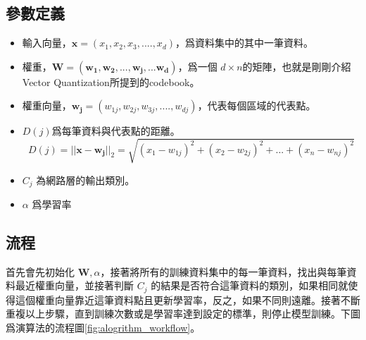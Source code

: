 	\subsection{參數定義}

    \begin{itemize}
        \item
			輸入向量，\(\mathbf{x} = (x_1,x_2,x_3,....,x_d)\)，爲資料集中的其中一筆資料。

        
        \item
			權重，\(\mathbf{W} = (\mathbf{w_1,w_2,...,w_j,...w_d})\)，爲一個 \(d \times n \)的矩陣，也就是剛剛介紹Vector Quantization所提到的codebook。 
        \item
			權重向量，\(\mathbf{w_{j}} = (w_{1j},w_{2j},w_{3j},....,w_{dj})\)，代表每個區域的代表點。
        
        \item
			\(D(j)\)爲每筆資料與代表點的距離。
			$$D(j)=||\mathbf{x}-\mathbf{w_j}||_2 = \sqrt{(x_1-w_{1j})^2+(x_2-w_{2j})^2+...+(x_n-w_{nj})^2} $$


        \item
		\(C_j\) 為網路層的輸出類別。

		\item
		\(\alpha\) 爲學習率
		 
    \end{itemize}


\subsection{流程}

首先會先初始化 \(\mathbf{W},\alpha\)，接著將所有的訓練資料集中的每一筆資料，找出與每筆資料最近權重向量，並接著判斷 \(C_j\) 的結果是否符合這筆資料的類別，如果相同就使得這個權重向量靠近這筆資料點且更新學習率，反之，如果不同則遠離。接著不斷重複以上步驟，直到訓練次數或是學習率達到設定的標準，則停止模型訓練。下圖爲演算法的流程圖\ref{fig:alogrithm_workflow}。

\newpage

\usetikzlibrary{positioning, shapes.geometric}



